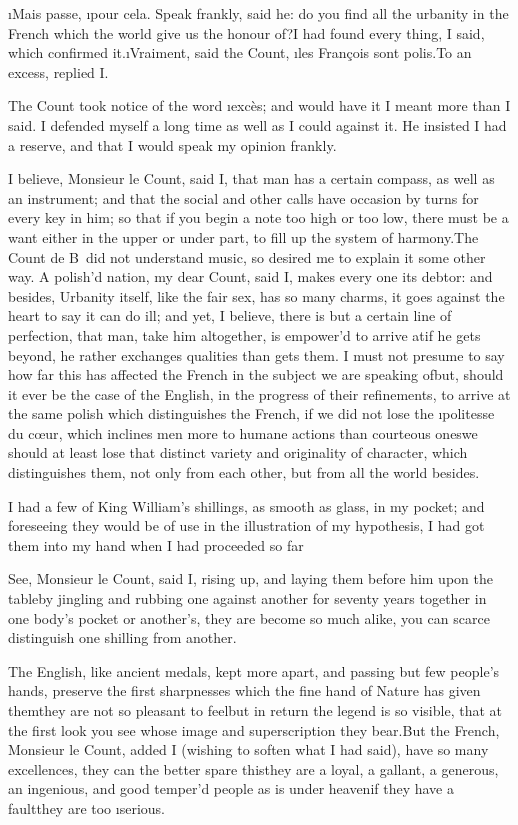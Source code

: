 \documentclass[twoside]{article}
\begin{document}
\tskk \i{Mais passe}, \i{pour cela}.\tskk
Speak frankly, said he: do you find all
the urbanity in the French which the world
give us the honour of?\tskk I had found
every thing, I said, which confirmed
it.\tskk \i{Vraiment}, said the Count,
\i{les François sont polis}.\tskk To an
excess, replied I.

The Count took notice of the word
\i{excès}; and would have it I meant more
than I said.  I defended myself a long
time as well as I could against it.\tskk
He insisted I had a reserve, and that I
would speak my opinion frankly.

I believe, Monsieur le Count, said I, that
man has a certain compass, as well as an
instrument; and that the social and other
calls have occasion by turns for every key
in him; so that if you begin a note too
high or too low, there must be a want
either in the upper or under part, to fill
up the system of harmony.\tskk The Count
de B\anon\ did not understand music, so
desired me to explain it some other way.
A polish’d nation, my dear Count, said I,
makes every one its debtor: and besides,
Urbanity itself, like the fair sex, has so
many charms, it goes against the heart to
say it can do ill; and yet, I believe,
there is but a certain line of perfection,
that man, take him altogether, is
empower’d to arrive at\tskk if he gets
beyond, he rather exchanges qualities than
gets them.  I must not presume to say how
far this has affected the French in the
subject we are speaking of\tskk but,
should it ever be the case of the English,
in the progress of their refinements, to
arrive at the same polish which
distinguishes the French, if we did not
lose the \i{politesse du cœur}, which
inclines men more to humane actions than
courteous ones\tskk we should at least
lose that distinct variety and originality
of character, which distinguishes them,
not only from each other, but from all the
world besides.

I had a few of King William’s shillings,
as smooth as glass, in my pocket; and
foreseeing they would be of use in the
illustration of my hypothesis, I had got
them into my hand when I had proceeded so
far\tskk 

See, Monsieur le Count, said I, rising up,
and laying them before him upon the
table\tskk by jingling and rubbing one
against another for seventy years together
in one body’s pocket or another’s, they
are become so much alike, you can scarce
distinguish one shilling from another.

The English, like ancient medals, kept
more apart, and passing but few people’s
hands, preserve the first sharpnesses
which the fine hand of Nature has given
them\tskk they are not so pleasant to
feel\tskk but in return the legend is so
visible, that at the first look you see
whose image and superscription they
bear.\tskk But the French, Monsieur le
Count, added I (wishing to soften what I
had said), have so many excellences, they
can the better spare this\tskk they are a
loyal, a gallant, a generous, an
ingenious, and good temper’d people as is
under heaven\tskk if they have a
fault\tskk they are too \i{serious}.
\end{document}
